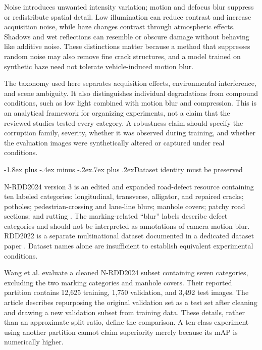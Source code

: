 \documentclass[11pt,a4paper]{article}
\makeatletter
\renewcommand\subsection{\@startsection{subsection}{2}{\z@}%
  {-1.8ex plus -.4ex minus -.2ex}{.7ex plus .2ex}{\normalfont\normalsize\bfseries}}
\makeatother
\begin{document}
Noise introduces unwanted intensity variation; motion and defocus blur suppress or redistribute spatial detail. Low illumination can reduce contrast and increase acquisition noise, while haze changes contrast through atmospheric effects. Shadows and wet reflections can resemble or obscure damage without behaving like additive noise. These distinctions matter because a method that suppresses random noise may also remove fine crack structures, and a model trained on synthetic haze need not tolerate vehicle-induced motion blur.

The taxonomy used here separates acquisition effects, environmental interference, and scene ambiguity. It also distinguishes individual degradations from compound conditions, such as low light combined with motion blur and compression. This is an analytical framework for organizing experiments, not a claim that the reviewed studies tested every category. A robustness claim should specify the corruption family, severity, whether it was observed during training, and whether the evaluation images were synthetically altered or captured under real conditions.

\subsection{Dataset identity must be preserved}

N-RDD2024 version 3 is an edited and expanded road-defect resource containing ten labeled categories: longitudinal, transverse, alligator, and repaired cracks; potholes; pedestrian-crossing and lane-line blurs; manhole covers; patchy road sections; and rutting \cite{r7}. The marking-related ``blur'' labels describe defect categories and should not be interpreted as annotations of camera motion blur. RDD2022 is a separate multinational dataset documented in a dedicated dataset paper \cite{r9}. Dataset names alone are insufficient to establish equivalent experimental conditions.

Wang et al. \cite{r3} evaluate a cleaned N-RDD2024 subset containing seven categories, excluding the two marking categories and manhole covers. Their reported partition contains 12,625 training, 1,750 validation, and 3,492 test images. The article describes repurposing the original validation set as a test set after cleaning and drawing a new validation subset from training data. These details, rather than an approximate split ratio, define the comparison. A ten-class experiment using another partition cannot claim superiority merely because its mAP is numerically higher.
\end{document}
